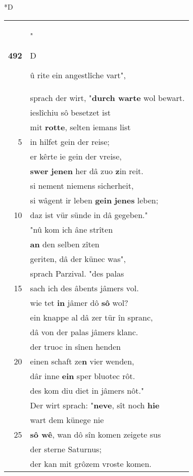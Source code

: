 \documentclass[8pt,a4paper,notitlepage]{article}
\begin{document}
\begin{table}[ht]
\begin{minipage}[t]{0.5\linewidth}
\small
\begin{center}*D
\end{center}
\begin{tabular}{rl}
\textbf{492} & "\begin{large}D\end{large}û rite ein angestlîche vart",\\ 
 & sprach der wirt, "\textbf{durch warte} wol bewart.\\ 
 & ieslîchiu sô besetzet ist\\ 
 & mit \textbf{rotte}, selten iemans list\\ 
5 & in hilfet gein der reise;\\ 
 & er kêrte ie gein der vreise,\\ 
 & \textbf{swer} \textbf{jenen} her dâ zuo \textbf{z}in reit.\\ 
 & si nement niemens sicherheit,\\ 
 & si wâgent ir leben \textbf{gein} \textbf{jenes} leben;\\ 
10 & daz ist vür sünde in dâ gegeben."\\ 
 & "nû kom ich âne strîten\\ 
 & \textbf{an} den selben zîten\\ 
 & geriten, dâ der künec was",\\ 
 & sprach Parzival. "des palas\\ 
15 & sach ich des âbents jâmers vol.\\ 
 & wie tet \textbf{in} jâmer dô \textbf{sô} wol?\\ 
 & ein knappe al dâ zer tür în spranc,\\ 
 & dâ von der palas jâmers klanc.\\ 
 & der truoc in sînen henden\\ 
20 & einen schaft ze\textbf{n} vier wenden,\\ 
 & dâr inne \textbf{ein} sper bluotec rôt.\\ 
 & des kom diu diet in jâmers nôt."\\ 
 & Der wirt sprach: "\textbf{neve}, sît noch \textbf{hie}\\ 
 & wart dem künege nie\\ 
25 & \textbf{sô wê}, wan dô sîn komen zeigete sus\\ 
 & der sterne Saturnus;\\ 
 & der kan mit grôzem vroste komen.\\ 

\end{tabular}
\end{minipage}
\end{table}
\end{document}

